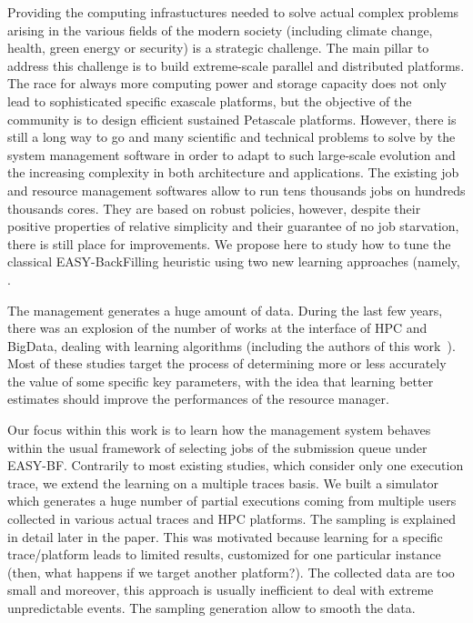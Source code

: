 \documentclass[sigconf]{acmart}
\begin{document}
Providing the computing infrastuctures needed to solve actual complex
problems arising in the various fields of the modern society (including
climate change, health, green energy or security) is a strategic challenge.
The main pillar to address this challenge is to build extreme-scale
parallel and distributed platforms.
The race for always more computing power and storage capacity does not
only lead to sophisticated specific exascale platforms, but the
objective of the community is to design efficient sustained Petascale
platforms.
However, there is still a long way to go and many scientific and
technical problems to solve by the system management software in order
to adapt to such large-scale evolution and the increasing complexity
in both architecture and applications.
The existing job and resource management softwares allow to run tens
thousands jobs on hundreds thousands cores.
They are based on robust policies, however, despite their positive
properties of relative simplicity and their guarantee of no job starvation,
there is still place for improvements.
We propose here to study how to tune the classical EASY-BackFilling
heuristic using two new learning approaches (namely, .

\bigskip
The management generates a huge amount of data.
During the last few years, there was an explosion of the number of works
at the interface of HPC and BigData, dealing with learning algorithms
(including the authors of this work~\cite{learningruntimes}).
Most of these studies target the process of determining more or less
accurately the value of some specific key parameters, with the idea that
learning better estimates should improve the performances of the
resource manager.

\bigskip
Our focus within this work is to learn how the management system behaves
within the usual framework of selecting jobs of the submission queue
under EASY-BF.
Contrarily to most existing studies, which consider only one execution
trace, we extend the learning on a multiple traces basis.
We built a simulator which generates a huge number of partial executions
coming from multiple users collected in various actual traces and HPC
platforms.
The sampling is explained in detail later in the paper.
This was motivated because learning for a specific trace/platform leads
to limited results, customized for one particular instance (then, what
happens if we target another platform?).
The collected data are too small and moreover, this approach is usually
inefficient to deal with extreme unpredictable events.
The sampling generation allow to smooth the data.
\end{document}
